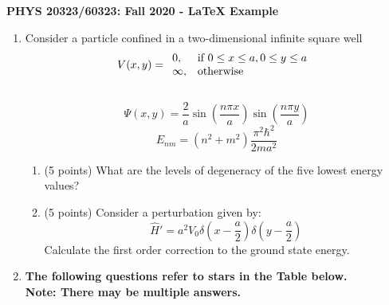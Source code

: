 \documentclass[12pt]{article}
\begin{document}
\def\pos{\medskip\quad}
\def\subpos{\smallskip \qquad}

\begin{center}
{\large \bf PHYS 20323/60323: Fall 2020 - LaTeX Example}\\
\end{center}
\begin{enumerate}
\item { Consider a particle confined in a two-dimensional infinite square well } \\
  \[
    V(x,y)=
                \begin{array}{ll}
                  0,& \text{if $ 0 \leq x \leq a, 0 \leq y \leq a $ }\\
                  \infty,& \text{otherwise}\\
                \end{array}
  \]
 \\
  \[
\Psi (x,y) =  \frac{2}{a} \sin(\frac{n\pi x}{a}) \sin(\frac{n\pi y}{a})
  \]
 \[
E_{nm} =( n^2 + m^2) \frac{\pi^2 \hbar^2}{2ma^2}
\]
\begin{enumerate}
    \item (5 points) What are the levels of degeneracy of the five lowest energy values?
    \item (5 points) Consider a perturbation given by: 
 \[
\hat H' =a^2 V_0  \delta(x - \frac{a}{2}) \delta(y - \frac{a}{2})
\]
\noindent Calculate the first order correction to the ground state energy.\\
 \end{enumerate} 

\item \bf The following questions refer to stars in the Table below.\\
\normalfont Note: There may be multiple answers.


\end{enumerate}
\end{document}
